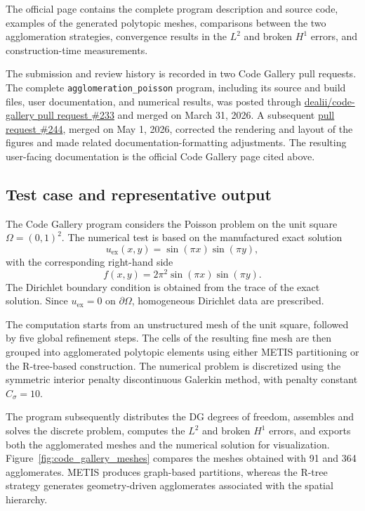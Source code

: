 \documentclass[a4paper,12pt]{article}
\begin{document}
The official page contains the complete program description and source code,
examples of the generated polytopic meshes, comparisons between the two
agglomeration strategies, convergence results in the $L^2$ and broken
$H^1$ errors, and construction-time measurements.

The submission and review history is recorded in two Code Gallery pull
requests. The complete \texttt{agglomeration\_poisson} program, including its
source and build files, user documentation, and numerical results, was
posted through
\href{https://github.com/dealii/code-gallery/pull/233}
{dealii/code-gallery pull request \#233} and merged on March 31, 2026. A
subsequent
\href{https://github.com/dealii/code-gallery/pull/244}
{pull request \#244}, merged on May 1, 2026, corrected the rendering and layout
of the figures and made related documentation-formatting adjustments. The resulting user-facing documentation is the official Code
Gallery page cited above.


\subsection{{Test case and representative output}}

The Code Gallery program considers the Poisson problem on the unit square
$\Omega=(0,1)^2$. The numerical test is based on the manufactured exact
solution
\begin{equation}
    u_{\mathrm{ex}}(x,y)
    =
    \sin(\pi x)\sin(\pi y),
\end{equation}
with the corresponding right-hand side
\begin{equation}
    f(x,y)
    =
    2\pi^2\sin(\pi x)\sin(\pi y).
\end{equation}
The Dirichlet boundary condition is obtained from the trace of the exact
solution. Since $u_{\mathrm{ex}}=0$ on $\partial\Omega$, homogeneous
Dirichlet data are prescribed. 

The computation starts from an unstructured mesh of the unit square, followed
by five global refinement steps. The cells of the resulting fine mesh are
then grouped into agglomerated polytopic elements using either METIS
partitioning or the R-tree-based construction. The numerical problem is
discretized using the symmetric interior penalty discontinuous Galerkin
method, with penalty constant $C_{\sigma}=10$.

The program subsequently distributes the DG degrees of freedom, assembles and
solves the discrete problem, computes the $L^2$ and broken $H^1$ errors, and
exports both the agglomerated meshes and the numerical solution for
visualization. Figure~\ref{fig:code_gallery_meshes} compares the meshes
obtained with 91 and 364 agglomerates. METIS produces graph-based partitions,
whereas the R-tree strategy generates geometry-driven agglomerates associated
with the spatial hierarchy.
\end{document}
